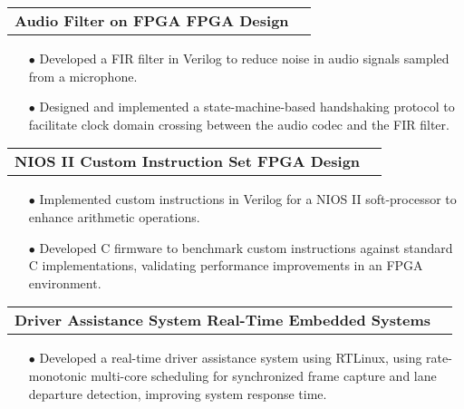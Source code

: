 \documentclass[11pt]{article}
\makeatletter
\newcommand{\resumeSubheadingP}[2]{
  \vspace{-2pt}\item
    \begin{tabular*}{1.0\textwidth}[t]{l@{\extracolsep{\fill}}r}
       \textbf{{\large #1}}&{#2} \\
    \end{tabular*}\vspace{-1pt}
}
\makeatother
\begin{document}
\resumeSubheadingP
{Audio Filter on FPGA \textbar{ } FPGA Design}{ }
\begin{itemize}[leftmargin=0.3in]\setlength{\itemsep}{0pt}\setlength{\parskip}{0pt}\vspace{-0.2cm}
  \item[$\bullet$] Developed a FIR filter in Verilog to reduce noise in audio signals sampled from a microphone.
  \item[$\bullet$] Designed and implemented a state-machine-based handshaking protocol to facilitate clock domain crossing between the audio codec and the FIR filter.
\end{itemize}
\vspace{-0.3cm}

\resumeSubheadingP
{NIOS II Custom Instruction Set \textbar{ } FPGA Design}{}
\begin{itemize}[leftmargin=0.3in]\setlength{\itemsep}{0pt}\setlength{\parskip}{0pt}\vspace{-0.2cm}
  \item[$\bullet$] Implemented custom instructions in Verilog for a NIOS II soft-processor to enhance arithmetic operations.
  \item[$\bullet$] Developed C firmware to benchmark custom instructions against standard C implementations, validating performance improvements in an FPGA environment.
\end{itemize}
\vspace{-0.2cm}

\resumeSubheadingP
{Driver Assistance System \textbar{ } Real-Time Embedded Systems }{}
\begin{itemize}[leftmargin=0.3in]\setlength{\itemsep}{0pt}\setlength{\parskip}{0pt}\vspace{-0.2cm}
  \item[$\bullet$] Developed a real-time driver assistance system using RTLinux, using rate-monotonic multi-core scheduling for synchronized frame capture and lane departure detection, improving system response time.
\end{itemize}
\vspace{-0.2cm}
\end{document}
